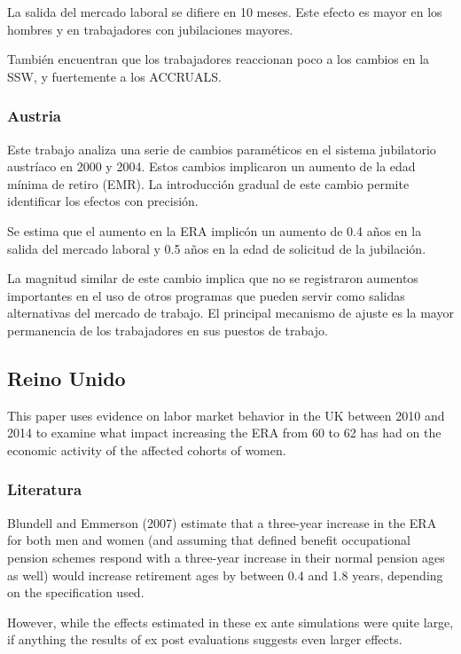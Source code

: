 \documentclass[]{article}
\begin{document}
La salida del mercado laboral se difiere en 10 meses. Este efecto es
mayor en los hombres y en trabajadores con jubilaciones mayores.

También encuentran que los trabajadores reaccionan poco a los cambios en
la SSW, y fuertemente a los ACCRUALS.

\hypertarget{austria}{%
\subsubsection{Austria}\label{austria}}

Este trabajo analiza una serie de cambios paraméticos en el sistema
jubilatorio austríaco en 2000 y 2004. Estos cambios implicaron un
aumento de la edad mínima de retiro (EMR). La introducción gradual de
este cambio permite identificar los efectos con precisión.

Se estima que el aumento en la ERA implicón un aumento de 0.4 años en la
salida del mercado laboral y 0.5 años en la edad de solicitud de la
jubilación.

La magnitud similar de este cambio implica que no se registraron
aumentos importantes en el uso de otros programas que pueden servir como
salidas alternativas del mercado de trabajo. El principal mecanismo de
ajuste es la mayor permanencia de los trabajadores en sus puestos de
trabajo.

\hypertarget{reino-unido}{%
\subsection{Reino Unido}\label{reino-unido}}

This paper uses evidence on labor market behavior in the UK between 2010
and 2014 to examine what impact increasing the ERA from 60 to 62 has had
on the economic activity of the affected cohorts of women.

\hypertarget{literatura}{%
\subsubsection{Literatura}\label{literatura}}

Blundell and Emmerson (2007) estimate that a three-year increase in the
ERA for both men and women (and assuming that defined benefit
occupational pension schemes respond with a three-year increase in their
normal pension ages as well) would increase retirement ages by between
0.4 and 1.8 years, depending on the specification used.

However, while the effects estimated in these ex ante simulations were
quite large, if anything the results of ex post evaluations suggests
even larger effects.
\end{document}

